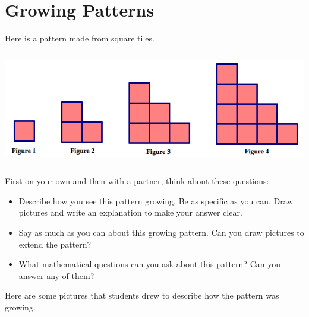 \newpage

\section{Growing Patterns}
Here is a pattern made from square tiles.

\begin{center}
\includegraphics[height=5cm]{staircase}
\end{center}


\bigskip
\bigskip



\begin{thinkpair*}
First on your own and then with a partner, think about these questions:
\begin{itemize}
\item
Describe how you see this pattern growing.  Be as specific as you can.  Draw pictures and write an explanation to make your answer clear.\\

\item
Say as much as you can about this growing pattern.  Can you draw pictures to extend the pattern?  \\

\item
What mathematical questions can you ask about this pattern?  Can you answer any of them?\\
\end{itemize}
\end{thinkpair*}

\newpage

Here are some pictures that students drew to describe how the pattern was growing.  

